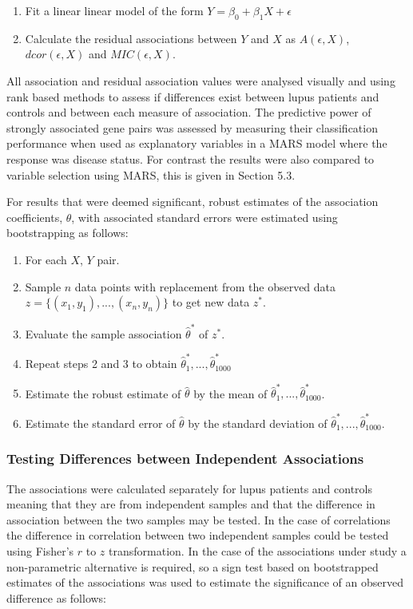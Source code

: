 \documentclass[a4paper, 12pt]{report}
\begin{document}
\begin{enumerate}

\item Fit a linear linear model of the form $Y = \beta_0 + \beta_1X + \epsilon$
\item Calculate the residual associations between $Y$ and $X$ as $A(\epsilon, X)$, $dcor(\epsilon, X)$ and $MIC(\epsilon, X)$.

\end{enumerate}

All association and residual association values were analysed visually and using rank based methods to assess if differences exist between lupus patients and controls and between each measure of association. The predictive power of strongly associated gene pairs was assessed by measuring their classification performance when used as explanatory variables in a MARS model where the response was disease status. For contrast the results were also compared to variable selection using MARS, this is given in Section 5.3.

 For results that were deemed significant, robust estimates of the association coefficients, $\hat{\theta}$, with associated standard errors were estimated using bootstrapping as follows:

\begin{enumerate}

\item For each $X$, $Y$ pair.
\item Sample $n$ data points with replacement from the observed data $z = \{ (x_1,y_1),...,(x_n,y_n) \}$ to get new data $z^*$.
\item Evaluate the sample association $\hat{\theta}^*$ of $z^*$.
\item Repeat steps 2 and 3 to obtain $\hat{\theta}_1^*,...,\hat{\theta}_{1000}^*$
\item Estimate the robust estimate of $\hat{\theta}$ by the mean of $\hat{\theta}_1^*,...,\hat{\theta}_{1000}^*$.
\item Estimate the standard error of $\hat{\theta}$ by the standard deviation of $\hat{\theta}_1^*,...,\hat{\theta}_{1000}^*$.

\end{enumerate}

\subsubsection{Testing Differences between Independent Associations}
The associations were calculated separately for lupus patients and controls meaning that they are from independent samples and that the difference in association between the two samples may be tested. In the case of correlations the difference in correlation between two independent samples could be tested using Fisher's $r$ to $z$ transformation.  In the case of the associations under study a non-parametric alternative is required, so a sign test based on bootstrapped estimates of the associations was used to estimate the significance of an observed difference as follows:
\end{document}
